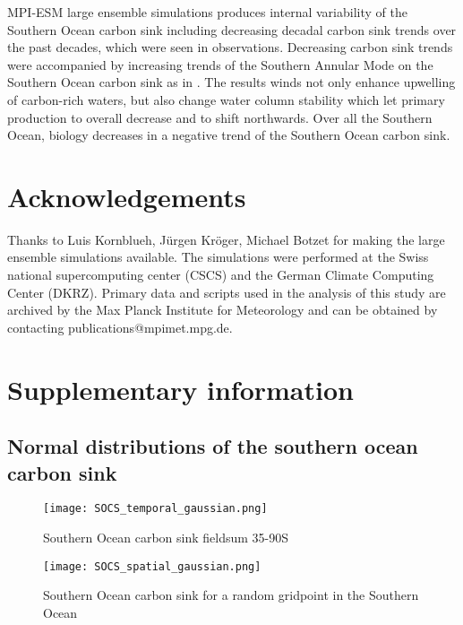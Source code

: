 \documentclass[12pt]{article}
\begin{document}
MPI-ESM large ensemble simulations produces internal variability of the Southern Ocean carbon sink including decreasing decadal carbon sink trends over the past decades, which were seen in observations. Decreasing carbon sink trends were accompanied by increasing trends of the Southern Annular Mode on the Southern Ocean carbon sink as in \cite{LeQuere2007}. The results winds not only enhance upwelling of carbon-rich waters, but also change water column stability which let primary production to overall decrease and to shift northwards. Over all the Southern Ocean, biology decreases in a negative trend of the Southern Ocean carbon sink. 

\section*{Acknowledgements}
Thanks to Luis Kornblueh, Jürgen Kröger, Michael Botzet for making the large ensemble simulations available. The simulations were performed at the Swiss national supercomputing center (CSCS) and the German Climate Computing Center (DKRZ). Primary data and scripts used in the analysis of this study are archived by the Max Planck Institute for Meteorology and can be obtained by contacting publications@mpimet.mpg.de.


\newpage





\newpage

\section*{Supplementary information}

\subsection*{Normal distributions of the southern ocean carbon sink}
\begin{figure}
\texttt{[image: SOCS\_temporal\_gaussian.png]} %
\label{fig:SOCS_temporal_gaussian}
\caption{Southern Ocean carbon sink fieldsum 35-90S}
\end{figure}

\begin{figure}
\texttt{[image: SOCS\_spatial\_gaussian.png]} %
\label{fig:SOCS_spatial_gaussian}
\caption{Southern Ocean carbon sink for a random gridpoint in the Southern Ocean}
\end{figure}
\end{document}
